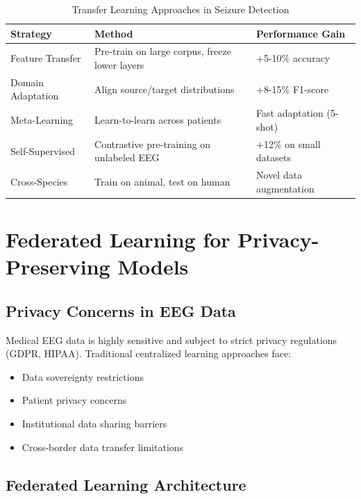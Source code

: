 \documentclass[12pt,a4paper]{article}
\begin{document}
\begin{table}[H]
\centering
\caption{Transfer Learning Approaches in Seizure Detection}
\label{tab:transfer}
\begin{tabular}{lp{4cm}p{4cm}}
\toprule
\textbf{Strategy} & \textbf{Method} & \textbf{Performance Gain} \\
\midrule
Feature Transfer & Pre-train on large corpus, freeze lower layers & +5-10\% accuracy \\
Domain Adaptation & Align source/target distributions & +8-15\% F1-score \\
Meta-Learning & Learn-to-learn across patients & Fast adaptation (5-shot) \\
Self-Supervised & Contrastive pre-training on unlabeled EEG & +12\% on small datasets \\
Cross-Species & Train on animal, test on human & Novel data augmentation \\
\bottomrule
\end{tabular}
\end{table}

\section{Federated Learning for Privacy-Preserving Models}

\subsection{Privacy Concerns in EEG Data}

Medical EEG data is highly sensitive and subject to strict privacy regulations (GDPR, HIPAA). Traditional centralized learning approaches face:
\begin{itemize}
    \item Data sovereignty restrictions
    \item Patient privacy concerns
    \item Institutional data sharing barriers
    \item Cross-border data transfer limitations
\end{itemize}

\subsection{Federated Learning Architecture}
\end{document}
